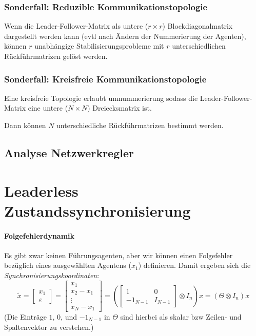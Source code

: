 
\subsubsection{Sonderfall: Reduzible Kommunikationstopologie}
Wenn die Leader-Follower-Matrix als untere ($r\times r$) Blockdiagonalmatrix
dargestellt werden kann (evtl nach Ändern der Nummerierung der Agenten),
können $r$ unabhängige Stabilisierungsprobleme mit $r$ unterschiedlichen
Rückführmatrizen gelöst werden.

\subsubsection{Sonderfall: Kreisfreie Kommunikationstopologie}
Eine kreisfreie Topologie erlaubt umnummerierung sodass die
Leader-Follower-Matrix eine untere ($N\times N$) Dreiecksmatrix ist.

Dann können $N$ unterschiedliche Rückführmatrizen bestimmt werden.

\subsection{Analyse Netzwerkregler}

\section{Leaderless Zustandssynchronisierung}
\paragraph{Folgefehlerdynamik}
Es gibt zwar keinen Führungsagenten, aber wir können einen Folgefehler
bezüglich eines ausgewählten Agentens ($x_1$) definieren.
Damit ergeben sich die \emph{Synchronisierungskoordinaten}:
\begin{equation}
    \tilde{x} = \begin{bmatrix}
        x_1 \\
        \varepsilon
    \end{bmatrix}
    = \begin{bmatrix}
        x_1 \\
        x_2 - x_1 \\
        \vdots \\
        x_N - x_1
    \end{bmatrix}
    = \left(\begin{bmatrix}
        1 & 0 \\
        -1_{N-1} & I_{N-1}
    \end{bmatrix}
    \otimes I_n
    \right) x
    = (\Theta \otimes I_n)x
\end{equation}
(Die Einträge $1$, $0$, und $-1_{N-1}$ in $\Theta$ sind hierbei als skalar bzw Zeilen- und Spaltenvektor zu verstehen.)

